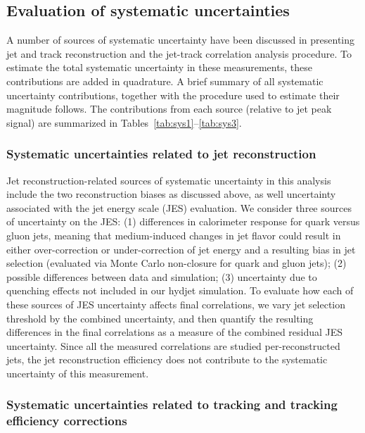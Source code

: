                  

\clearpage

	
\subsection{Evaluation of systematic uncertainties}

A number of sources of systematic uncertainty have been discussed in presenting jet and track reconstruction and the jet-track correlation analysis procedure.  To estimate the total systematic uncertainty in these measurements, these contributions are added in quadrature.  A brief summary of all systematic uncertainty contributions, together with the procedure used to estimate their magnitude follows.  The contributions from each source (relative to jet peak signal) are summarized in Tables~\ref{tab:sys1}--\ref{tab:sys3}.

\subsubsection{Systematic uncertainties related to jet reconstruction}

Jet reconstruction-related sources of systematic uncertainty in this analysis include the two reconstruction biases as discussed above, as well uncertainty associated with the jet energy scale (JES) evaluation.  We consider three sources of uncertainty on the JES:  (1) differences in calorimeter response for quark versus gluon jets, meaning that medium-induced changes in jet flavor could result in either over-correction or under-correction of jet energy and a resulting bias in jet selection (evaluated via Monte Carlo non-closure for quark and gluon jets); (2) possible differences between data and simulation; (3) uncertainty due to quenching effects not included in our {\sc hydjet} simulation.  To evaluate how each of these sources of JES uncertainty affects final correlations, we vary jet selection threshold by the combined uncertainty, and then quantify the resulting differences in the final correlations as a measure of the combined residual JES uncertainty. Since all the measured correlations are studied per-reconstructed jets, the jet reconstruction efficiency does not contribute to the systematic uncertainty of this measurement.

\subsubsection{Systematic uncertainties related to tracking and tracking efficiency corrections}

